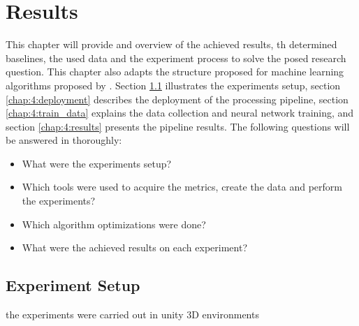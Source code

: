 
\chapter{Results}\label{chap:4}


    
This chapter will provide and overview of the achieved results, th determined baselines, the used data and the experiment process to solve the posed research question. 
This chapter also adapts the structure proposed for machine learning algorithms proposed by \textcite{luckert2016using}.
Section \ref{chap:4:setup} illustrates the experiments setup, 
section \ref{chap:4:deployment} describes the deployment of the processing pipeline, 
section \ref{chap:4:train_data} explains the data collection and neural network training, 
and section \ref{chap:4:results} presents the pipeline results. The following questions will be answered in thoroughly:
\begin{itemize}
    \item What were the experiments setup?
    \item Which tools were used to acquire the metrics, create the data and perform the experiments?
    \item Which algorithm optimizations were done?
    \item What were the achieved results on each experiment?
\end{itemize}

\section{Experiment Setup}\label{chap:4:setup}
the experiments were carried out in unity 3D environments

